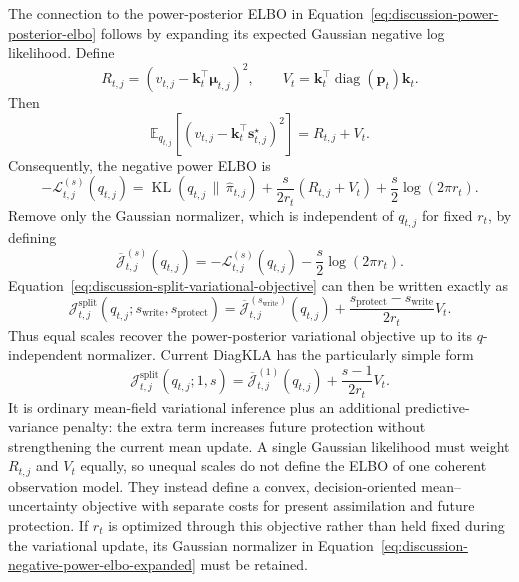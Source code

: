 \documentclass[11pt]{article}
\newcommand{\vct}[1]{\boldsymbol{#1}}
\newcommand{\diag}{\operatorname{diag}}
\begin{document}
The connection to the power-posterior ELBO in
Equation~\eqref{eq:discussion-power-posterior-elbo} follows by expanding its expected Gaussian
negative log likelihood. Define
\begin{equation}
  R_{t,j}
  =\left(v_{t,j}-\vct{k}_t^\top\vct{\mu}_{t,j}\right)^2,
  \qquad
  V_t=\vct{k}_t^\top\diag(\vct{p}_t)\vct{k}_t.
  \label{eq:discussion-mean-variance-loss-terms}
\end{equation}
Then
\begin{equation}
  \mathbb{E}_{q_{t,j}}
  \!\left[\left(v_{t,j}-\vct{k}_t^\top\vct{s}_{t,j}^\star\right)^2\right]
  =R_{t,j}+V_t.
  \label{eq:discussion-mean-variance-loss-decomposition}
\end{equation}
Consequently, the negative power ELBO is
\begin{equation}
  -\mathcal{L}_{t,j}^{(s)}(q_{t,j})
  =\operatorname{KL}(q_{t,j}\,\|\,\widehat\pi_{t,j})
   +\frac{s}{2r_t}(R_{t,j}+V_t)
   +\frac{s}{2}\log(2\pi r_t).
  \label{eq:discussion-negative-power-elbo-expanded}
\end{equation}
Remove only the Gaussian normalizer, which is independent of $q_{t,j}$ for fixed $r_t$, by
defining
\begin{equation}
  \overline{\mathcal{J}}_{t,j}^{(s)}(q_{t,j})
  =-\mathcal{L}_{t,j}^{(s)}(q_{t,j})
   -\frac{s}{2}\log(2\pi r_t).
  \label{eq:discussion-negative-power-elbo-q-objective}
\end{equation}
Equation~\eqref{eq:discussion-split-variational-objective} can then be written exactly as
\begin{equation}
  \mathcal{J}_{t,j}^{\mathrm{split}}
    (q_{t,j};s_{\mathrm{write}},s_{\mathrm{protect}})
  =\overline{\mathcal{J}}_{t,j}^{(s_{\mathrm{write}})}(q_{t,j})
   +\frac{s_{\mathrm{protect}}-s_{\mathrm{write}}}{2r_t}V_t.
  \label{eq:discussion-split-versus-power-elbo}
\end{equation}
Thus equal scales recover the power-posterior variational objective up to its $q$-independent
normalizer. Current DiagKLA has the particularly simple form
\begin{equation}
  \mathcal{J}_{t,j}^{\mathrm{split}}(q_{t,j};1,s)
  =\overline{\mathcal{J}}_{t,j}^{(1)}(q_{t,j})
   +\frac{s-1}{2r_t}V_t.
  \label{eq:discussion-current-diagkla-variational-objective}
\end{equation}
It is ordinary mean-field variational inference plus an additional predictive-variance penalty:
the extra term increases future protection without strengthening the current mean update. A
single Gaussian likelihood must weight $R_{t,j}$ and $V_t$ equally, so unequal scales do not
define the ELBO of one coherent observation model. They instead define a convex,
decision-oriented mean--uncertainty objective with separate costs for present assimilation and
future protection. If $r_t$ is optimized through this objective rather than held fixed during the
variational update, its Gaussian normalizer in
Equation~\eqref{eq:discussion-negative-power-elbo-expanded} must be retained.
\end{document}
